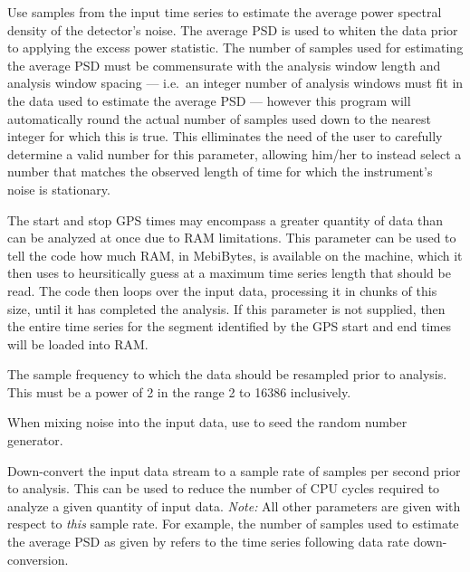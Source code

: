 \begin{entry}
\begin{entry}
\item[\option{--psd-average-points} \parm{samples}]
Use  samples from the input time series to estimate the
average power spectral density of the detector's noise.  The average PSD is
used to whiten the data prior to applying the excess power statistic.  The
number of samples used for estimating the average PSD must be commensurate
with the analysis window length and analysis window spacing --- i.e.\ an
integer number of analysis windows must fit in the data used to estimate
the average PSD --- however this program will automatically round the
actual number of samples used down to the nearest integer for which this is
true.  This elliminates the need of the user to carefully determine a valid
number for this parameter, allowing him/her to instead select a number that
matches the observed length of time for which the instrument's noise is
stationary.

\item[\option{--ram-limit} \parm{MebiBytes}]
The start and stop GPS times may encompass a greater quantity of data than
can be analyzed at once due to RAM limitations.  This parameter can be used
to tell the code how much RAM, in MebiBytes, is available on the machine,
which it then uses to heursitically guess at a maximum time series length
that should be read.  The code then loops over the input data, processing
it in chunks of this size, until it has completed the analysis.  If this
parameter is not supplied, then the entire time series for the segment
identified by the GPS start and end times will be loaded into RAM.

\item[\option{--resample-rate} \parm{Hz}]
The sample frequency to which the data should be resampled prior to
analysis.  This must be a power of 2 in the range \unit{2}{\hertz} to
\unit{16386}{\hertz} inclusively.

\item[\option{--seed} \parm{seed}]
When mixing noise into the input data, use  to seed the random
number generator.

\item[\option{--target-sample-rate} \parm{Hz}]
Down-convert the input data stream to a sample rate of  samples
per second prior to analysis.  This can be used to reduce the number of CPU
cycles required to analyze a given quantity of input data.  \emph{Note:}
All other parameters are given with respect to \emph{this} sample rate.
For example, the number of samples used to estimate the average PSD as
given by  refers to the time series following
data rate down-conversion.


\end{entry}
\end{entry}
